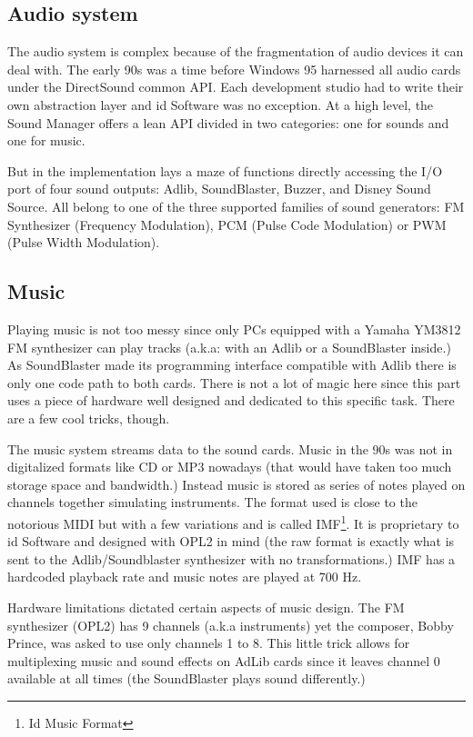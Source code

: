 \subsection{Audio system}
The audio system is complex because of the fragmentation of audio devices it can deal with. The early 90s was a time before Windows 95 harnessed all audio cards under the DirectSound common API. Each development studio had to write their own abstraction layer and id Software was no exception. At a high level, the Sound Manager offers a lean API divided in two categories: one for sounds and one for music.\\
\par
\begin{minipage}{\textwidth}

\end{minipage}
\par
But in the implementation lays a maze of functions directly accessing the I/O port of four sound outputs: Adlib, SoundBlaster, Buzzer, and Disney Sound Source. All belong to one of the three supported families of sound generators: FM Synthesizer (Frequency Modulation), PCM (Pulse Code Modulation) or PWM (Pulse Width Modulation).\\


\subsection{Music}
Playing music is not too messy since only PCs equipped with a Yamaha YM3812 FM synthesizer can play tracks (a.k.a: with an Adlib or a SoundBlaster inside.) As SoundBlaster made its programming interface compatible with Adlib there is only one code path to both cards. There is not a lot of magic here since this part uses a piece of hardware well designed and dedicated to this specific task. There are a few cool tricks, though.\\
\par
The music system streams data to the sound cards.  Music in the 90s was not in digitalized formats like CD or MP3 nowadays (that would have taken too much storage space and bandwidth.) Instead music is stored as series of notes played on channels together simulating instruments. The format used is close to the notorious MIDI but with a few variations and is called IMF\footnote{Id Music Format}. It is proprietary to id Software and designed with OPL2 in mind (the raw format is exactly what is sent to the Adlib/Soundblaster synthesizer with no transformations.) IMF has a hardcoded playback rate and music notes are played at 700 Hz.\\
\par
Hardware limitations dictated certain aspects of music design. The FM synthesizer (OPL2) has 9 channels (a.k.a instruments) yet the composer, Bobby Prince, was asked to use only channels 1 to 8. This little trick allows for multiplexing music and sound effects on AdLib cards since it leaves channel 0 available at all times (the SoundBlaster plays sound differently.)\\





